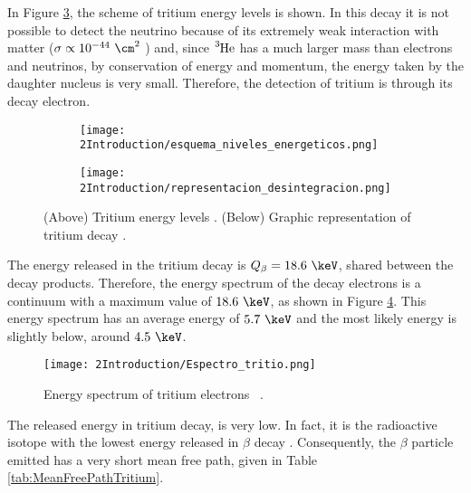 In Figure \ref{fig:TritiumDecay}, the scheme of tritium energy levels is shown. In this decay it is not possible to detect the neutrino because of its extremely weak interaction with matter ($\sigma \propto 10^{-44} ~ \cm^2$ \cite{CrossSeccionNeutrino}) and, since $\ce{^{3}He}$ has a much larger mass than electrons and neutrinos, by conservation of energy and momentum, the energy taken by the daughter nucleus is very small. Therefore, the detection of tritium is through its decay electron. 

\begin{figure}
\centering
    \begin{subfigure}[b]{0.55\textwidth}
    \centering
    \texttt{[image: 2Introduction/esquema\_niveles\_energeticos.png]}  
    \caption{\label{subfig:Energy_levels}}
    \end{subfigure}
    \hfill
    \begin{subfigure}[b]{0.4\textwidth}
    \centering
    \texttt{[image: 2Introduction/representacion\_desintegracion.png]}  
    \caption{\label{subfig:GraphicDesintegration}}
    \end{subfigure}
 \caption{(Above) Tritium energy levels \cite{TritiumDecayEnergyLevels}. (Below) Graphic representation of tritium decay \cite{TritiumDecayImage}.}
 \label{fig:TritiumDecay}
\end{figure}

The energy released in the tritium decay is $Q_\beta=18.6~\keV$, shared between the decay products. Therefore, the energy spectrum of the decay electrons is a continuum with a maximum value of $18.6~\keV$, as shown in Figure \ref{fig:TritiumDecaySpectrum}. This energy spectrum has an average energy of $5.7~\keV$ and the most likely energy is slightly below, around $4.5~\keV$.

\begin{figure}[h]
\texttt{[image: 2Introduction/Espectro\_tritio.png]}
\centering
\caption{Energy spectrum of tritium electrons ~\cite{TritiumEspectrum}.\label{fig:TritiumDecaySpectrum}}
\end{figure}

The released energy in tritium decay, is very low. In fact, it is the radioactive isotope with the lowest energy released in $\beta$ decay \cite{TritiumHandling}. Consequently, the $\beta$ particle emitted has a very short mean free path, given in Table \ref{tab:MeanFreePathTritium}.

